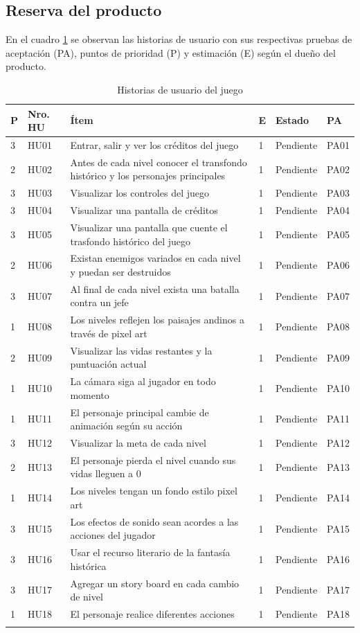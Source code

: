 \documentclass[a4paper, openright, 12pt]{report}
\begin{document}
\subsection*{Reserva del producto}
\justify
En el cuadro \ref{t: reservaP} se observan las historias de usuario con sus respectivas pruebas
de aceptación (PA), puntos de prioridad (P) y estimación (E) según el dueño
del producto.

\begin{longtable}{| l | l | p{5cm} | l | l | l |}
\hline
\textbf{P} & \textbf{Nro. HU} & \textbf{Ítem} & \textbf{E} & \textbf{Estado} & \textbf{PA}\\ \hline
3 & HU01 &
Entrar, salir y ver los créditos del juego &
1 & Pendiente & PA01 \\ \hline
2 & HU02 &
Antes de cada nivel conocer el transfondo histórico y los personajes principales  &
1 & Pendiente & PA02\\ \hline
3 & HU03 &
Visualizar los controles del juego &
1 & Pendiente & PA03 \\ \hline
3 & HU04 &
Visualizar una pantalla de créditos &
1 & Pendiente & PA04\\ \hline
3 & HU05 &
Visualizar una pantalla que cuente el trasfondo histórico del juego &
1 & Pendiente & PA05 \\ \hline
2 & HU06 &
Existan enemigos variados en cada nivel y puedan ser destruidos &
1 & Pendiente & PA06 \\ \hline
3 & HU07 &
Al final de cada nivel exista una batalla contra un jefe &
1 & Pendiente & PA07 \\ \hline
1 & HU08 &
Los niveles reflejen los paisajes andinos a través de pixel art &
1 & Pendiente & PA08 \\ \hline
2 & HU09 & 
Visualizar las vidas restantes y la puntuación actual &
1 & Pendiente & PA09 \\ \hline
1 & HU10 &
La cámara siga al jugador en todo momento &
1 & Pendiente & PA10 \\ \hline
1 & HU11 &
El personaje principal cambie de animación según su acción &
1 & Pendiente & PA11 \\ \hline
3 & HU12 &
Visualizar la meta de cada nivel &
1 & Pendiente & PA12 \\ \hline
2 & HU13 &
El personaje pierda el nivel cuando sus vidas lleguen a 0 &
1 & Pendiente & PA13 \\ \hline
1 & HU14 &
Los niveles tengan un fondo estilo pixel art &
1 & Pendiente & PA14 \\ \hline 
3 & HU15 &
Los efectos de sonido sean acordes a las acciones del jugador &
1 & Pendiente & PA15 \\ \hline
3 & HU16 &
Usar el recurso literario de la fantasía histórica &
1 & Pendiente & PA16 \\ \hline
3 & HU17 &
Agregar un story board en cada cambio de nivel &
1 & Pendiente & PA17 \\ \hline
1 & HU18 &
El personaje realice diferentes acciones  &
1 & Pendiente & PA18 \\ \hline
\caption{Historias de usuario del juego}
\label{t: reservaP}
\end{longtable}
\end{document}
